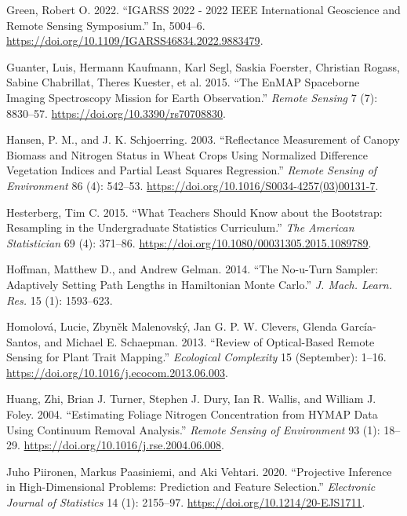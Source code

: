 \documentclass[
  letterpaper,
  DIV=11,
  numbers=noendperiod]{scrartcl}
\newlength{\cslhangindent}
\newlength{\cslentryspacingunit} %
\newenvironment{CSLReferences}[2] %
 {%
  \setlength{\parindent}{0pt}
  \ifodd #1
  \let\oldpar\par
  \def\par{\hangindent=\cslhangindent\oldpar}
  \fi
  \setlength{\parskip}{#2\cslentryspacingunit}
 }%
 {}
\begin{document}
\begin{CSLReferences}{1}{0}
\leavevmode{}%
Green, Robert O. 2022. {``IGARSS 2022 - 2022 IEEE International
Geoscience and Remote Sensing Symposium.''} In, 5004--6.
\url{https://doi.org/10.1109/IGARSS46834.2022.9883479}.

\leavevmode{}%
Guanter, Luis, Hermann Kaufmann, Karl Segl, Saskia Foerster, Christian
Rogass, Sabine Chabrillat, Theres Kuester, et al. 2015. {``The EnMAP
Spaceborne Imaging Spectroscopy Mission for Earth Observation.''}
\emph{Remote Sensing} 7 (7): 8830--57.
\url{https://doi.org/10.3390/rs70708830}.

\leavevmode{}%
Hansen, P. M., and J. K. Schjoerring. 2003. {``Reflectance Measurement
of Canopy Biomass and Nitrogen Status in Wheat Crops Using Normalized
Difference Vegetation Indices and Partial Least Squares Regression.''}
\emph{Remote Sensing of Environment} 86 (4): 542--53.
\url{https://doi.org/10.1016/S0034-4257(03)00131-7}.

\leavevmode{}%
Hesterberg, Tim C. 2015. {``What Teachers Should Know about the
Bootstrap: Resampling in the Undergraduate Statistics Curriculum.''}
\emph{The American Statistician} 69 (4): 371--86.
\url{https://doi.org/10.1080/00031305.2015.1089789}.

\leavevmode{}%
Hoffman, Matthew D., and Andrew Gelman. 2014. {``The No-u-Turn Sampler:
Adaptively Setting Path Lengths in Hamiltonian Monte Carlo.''} \emph{J.
Mach. Learn. Res.} 15 (1): 1593--623.

\leavevmode{}%
Homolová, Lucie, Zbyněk Malenovský, Jan G. P. W. Clevers, Glenda
García-Santos, and Michael E. Schaepman. 2013. {``Review of
Optical-Based Remote Sensing for Plant Trait Mapping.''}
\emph{Ecological Complexity} 15 (September): 1--16.
\url{https://doi.org/10.1016/j.ecocom.2013.06.003}.

\leavevmode{}%
Huang, Zhi, Brian J. Turner, Stephen J. Dury, Ian R. Wallis, and William
J. Foley. 2004. {``Estimating Foliage Nitrogen Concentration from HYMAP
Data Using Continuum Removal Analysis.''} \emph{Remote Sensing of
Environment} 93 (1): 18--29.
\url{https://doi.org/10.1016/j.rse.2004.06.008}.

\leavevmode{}%
Juho Piironen, Markus Paasiniemi, and Aki Vehtari. 2020. {``Projective
Inference in High-Dimensional Problems: Prediction and Feature
Selection.''} \emph{Electronic Journal of Statistics} 14 (1): 2155--97.
\url{https://doi.org/10.1214/20-EJS1711}.


\end{CSLReferences}
\end{document}
